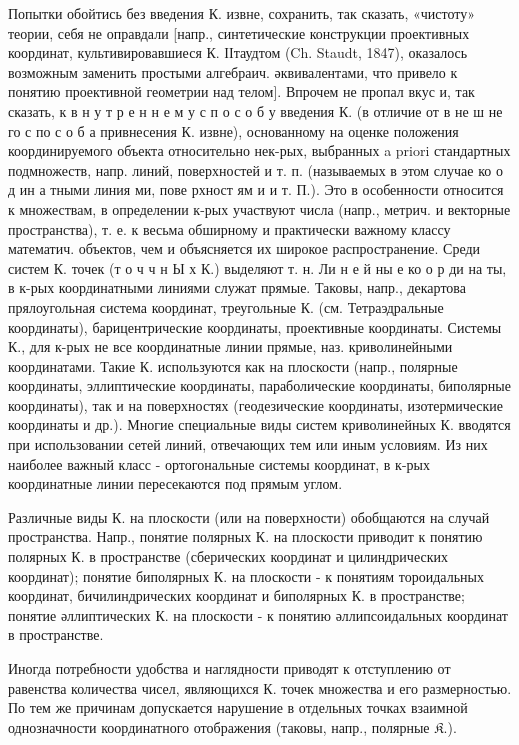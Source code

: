 \documentclass[10pt]{article}
\begin{document}
Попытки обойтись без введения К. извне, сохранить, так сказать, «чистоту» теории, себя не оправдали [напр., синтетические конструкции проективных координат, культивировавшиеся К. ІІтаудтом (Ch. Staudt, 1847), оказалось возможным заменить простыми алгебраич. әквивалентами, что привело к понятию проективной геометрии над телом]. Впрочем не пропал вкус и, так сказать, к в н у т р е н н е м у с п о с о б у введения К. (в отличие от в не ш не го с по с о б а привнесения К. извне), основанному на оценке положения координируемого объекта относительно нек-рых, выбранных a priori стандартных подмножеств, напр. линий, поверхностей и т. п. (называемых в этом случае ко о д ин а тными линия ми, пове рхност ям и и т. П.). Это в особенности относится к множествам, в определении к-рых участвуют числа (напр., метрич. и векторные пространства), т. е. к весьма обширному и практически важному классу математич. объектов, чем и объясняется их широкое распространение. Среди систем К. точек (т о ч ч н Ы х К.) выделяют т. н. Ли н е й ны е ко о р ди на ты, в к-рых координатными линиями служат прямые. Таковы, напр., декартова прялоугольная система координат, треугольные К. (см. Тетраэдральные координаты), барицентрические координаты, проективные координаты. Системы К., для к-рых не все координатные линии прямые, наз. криволинейными координатами. Такие К. используются как на плоскости (напр., полярные координаты, эллиптические координаты, параболические координаты, биполярные координаты), так и на поверхностях (геодезические координаты, изотермические координаты и др.). Многие специальные виды систем криволинейных К. вводятся при использовании сетей линий, отвечающих тем или иным условиям. Из них наиболее важный класс - ортогональные системы координат, в к-рых координатные линии пересекаются под прямым углом.



Различные виды К. на плоскости (или на поверхности) обобщаются на случай пространства. Напр., понятие полярных К. на плоскости приводит к понятию полярных К. в пространстве (сберических координат и цилиндрических координат); понятие биполярных К. на плоскости - к понятиям тороидальных координат, бичилиндрических координат и биполярных К. в пространстве; понятие әллиптических К. на плоскости - к понятию әллипсоидальных координат в пространстве.



Иногда потребности удобства и наглядности приводят к отступлению от равенства количества чисел, являющихся К. точек множества и его размерностью. По тем же причинам допускается нарушение в отдельных точках взаимной однозначности координатного отображения (таковы, напр., полярные $\mathfrak{K}$.).
\end{document}
